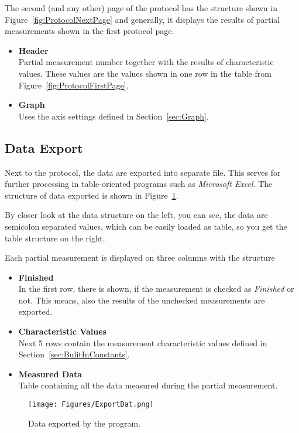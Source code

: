 \documentclass[a4paper,11pt,twoside]{book}
\theoremstyle{named}
\begin{document}
The second (and any other) page of the protocol has the structure shown in
Figure~\ref{fig:ProtocolNextPage} and generally, it displays the results of
partial measurements shown in the first protocol page.

\begin{itemize}
  \item \textbf{Header} \\
    Partial measurement number together with the results of characteristic
    values. These values are the values shown in one row in the table from
    Figure~\ref{fig:ProtocolFirstPage}.
  \item \textbf{Graph} \\
    Uses the axis settings defined in Section~\ref{sec:Graph}.
\end{itemize}

\subsection{Data Export}
\label{sec:DataExport}

Next to the protocol, the data are exported into separate file. This serves for
further processing in table-oriented programs such as \textit{Microsoft Excel}.
The structure of data exported is shown in Figure~\ref{fig:ExportDat}.

By closer look at the data structure on the left, you can see, the data are
semicolon separated values, which can be easily loaded as table, so you get 
the table structure on the right.

Each partial measurement is displayed on three columns with the structure

\begin{itemize}
  \item \textbf{Finished} \\
    In the first row, there is shown, if the measurement is checked as
    \textit{Finished} or not. This means, also the results of the unchecked
    measurements are exported.
  \item \textbf{Characteristic Values} \\
    Next 5 rows contain the measurement characteristic values defined in
    Section~\ref{sec:BulitInConstants}.
  \item \textbf{Measured Data} \\
    Table containing all the data measured during the partial measurement. 
\end{itemize}

\begin{figure}[t]
  \centering
  \texttt{[image: Figures/ExportDat.png]}
  \caption{Data exported by the program.}
  \label{fig:ExportDat}
\end{figure}
\end{document}
